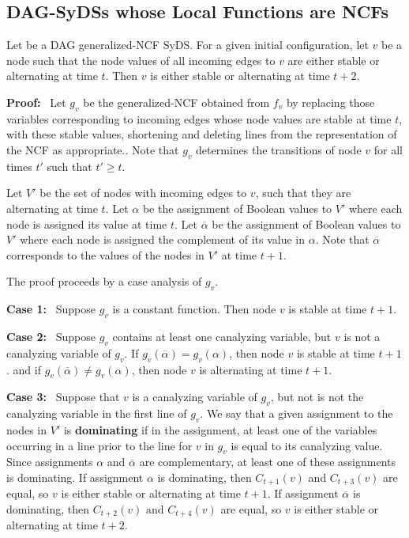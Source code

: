 \subsection{DAG-SyDSs whose Local Functions are NCFs}
\label{ssec:ncfs}

\begin{lemma}\label{lem:ncf_plus_two}
Let \cals{} be a DAG generalized-NCF SyDS.
For a given initial configuration,
let $v$ be a node such that the node values of all incoming edges to $v$
are  either stable or alternating at time $t$.
Then  $v$ is either stable or alternating at time $t+2$.
\end{lemma}

\noindent
\textbf{Proof:}~ Let $g_v$ be the generalized-NCF obtained from $f_v$  
by replacing those variables corresponding to incoming edges 
whose node values are stable at time $t$,
with these stable values,
shortening and deleting lines from the representation of the NCF as appropriate.. 
Note that $g_v$ determines the transitions of node $v$ for all times $t'$ such that $t' \geq t$.

Let $V'$ be the set of nodes with incoming edges to $v$, such that they are alternating at time $t$.
Let $\alpha$  be the assignment of Boolean values to $V'$ 
where each node  is assigned its value at time $t$.
Let $\overline{\alpha}$  be the assignment of Boolean values to $V'$ 
where each node  is assigned the complement of its value in $\alpha$.
Note that $\overline{\alpha}$ corresponds to the values of the nodes in $V'$ at time $t+1$.


The proof proceeds by a case analysis of $g_v$.

\noindent
\textbf{Case 1:}~ Suppose $g_v$ is a constant function.
Then node $v$ is stable at time $t+1$.

\noindent
\textbf{Case 2:}~ Suppose $g_v$ contains at least one canalyzing variable, 
but $v$ is not a canalyzing variable of $g_v$.
If $g_v(\overline{\alpha}) = g_v(\alpha)$, then node $v$ is stable at time $t+1$.
and if $g_v(\overline{\alpha}) \neq g_v(\alpha)$, 
then node $v$ is alternating at time $t+1$.

\noindent
\textbf{Case 3:}~ Suppose that $v$ is a canalyzing variable of $g_v$, 
but not is not the canalyzing variable in the first line of $g_v$.
We say that a given assignment to the nodes in $V'$ is {\bf dominating} 
if in the assignment, at least one of the variables occurring in a line prior to the line for $v$ in $g_v$
is equal to its canalyzing value.
Since assignments $\alpha$  and $\overline{\alpha}$ are complementary,
at least one of these assignments is dominating.
If assignment $\alpha$  is dominating, then $C_{t+1}(v)$ and $C_{t+3}(v)$ are equal,
so $v$ is either stable or alternating at time $t+1$.
If assignment $\overline{\alpha}$  is dominating, then $C_{t+2}(v)$ and $C_{t+4}(v)$ are equal,
so $v$ is either stable or alternating at time $t+2$.

